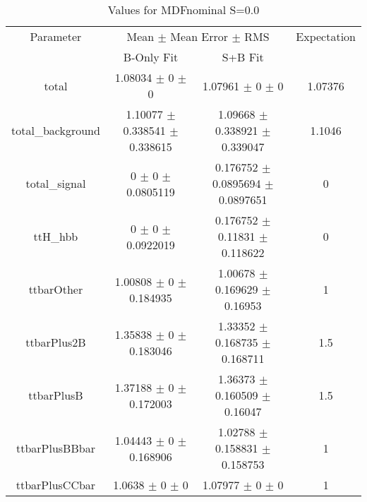\begin{table}
\centering
\caption{Values for MDFnominal S=0.0}
\begin{tabular}{cccc}
\toprule
Parameter & \multicolumn{2}{c}{Mean $\pm$ Mean Error $\pm$ RMS} & Expectation\\
 & B-Only Fit & S+B Fit & \\
\midrule
total & \num{1.08034} $\pm$ \num{0} $\pm$ \num{0} & \num{1.07961} $\pm$ \num{0} $\pm$ \num{0} & \num{1.07376}\\
total\_background & \num{1.10077} $\pm$ \num{0.338541} $\pm$ \num{0.338615} & \num{1.09668} $\pm$ \num{0.338921} $\pm$ \num{0.339047} & \num{1.1046}\\
total\_signal & \num{0} $\pm$ \num{0} $\pm$ \num{0.0805119} & \num{0.176752} $\pm$ \num{0.0895694} $\pm$ \num{0.0897651} & \num{0}\\
ttH\_hbb & \num{0} $\pm$ \num{0} $\pm$ \num{0.0922019} & \num{0.176752} $\pm$ \num{0.11831} $\pm$ \num{0.118622} & \num{0}\\
ttbarOther & \num{1.00808} $\pm$ \num{0} $\pm$ \num{0.184935} & \num{1.00678} $\pm$ \num{0.169629} $\pm$ \num{0.16953} & \num{1}\\
ttbarPlus2B & \num{1.35838} $\pm$ \num{0} $\pm$ \num{0.183046} & \num{1.33352} $\pm$ \num{0.168735} $\pm$ \num{0.168711} & \num{1.5}\\
ttbarPlusB & \num{1.37188} $\pm$ \num{0} $\pm$ \num{0.172003} & \num{1.36373} $\pm$ \num{0.160509} $\pm$ \num{0.16047} & \num{1.5}\\
ttbarPlusBBbar & \num{1.04443} $\pm$ \num{0} $\pm$ \num{0.168906} & \num{1.02788} $\pm$ \num{0.158831} $\pm$ \num{0.158753} & \num{1}\\
ttbarPlusCCbar & \num{1.0638} $\pm$ \num{0} $\pm$ \num{0} & \num{1.07977} $\pm$ \num{0} $\pm$ \num{0} & \num{1}\\
\bottomrule
\end{tabular}
\end{table}
